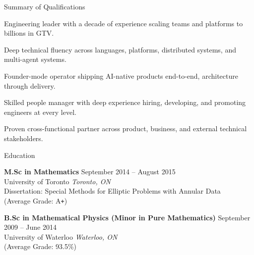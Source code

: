 \documentclass{resume} %
\begin{document}

\begin{rSection}{Summary of Qualifications}

\begin{rSubsection}{}{}{}{}
\item Engineering leader with a decade of experience scaling teams and platforms to billions in GTV.
\item Deep technical fluency across languages, platforms, distributed systems, and multi-agent systems.
\item Founder-mode operator shipping AI-native products end-to-end, architecture through delivery.
\item Skilled people manager with deep experience hiring, developing, and promoting engineers at every level.
\item Proven cross-functional partner across product, business, and external technical stakeholders.
\end{rSubsection}

\end{rSection}


\begin{rSection}{Education}

\textbf{M.Sc in Mathematics} \hfill {September 2014 -- August 2015} \\ 
University of Toronto  \hfill {\textit{Toronto, ON}} \\
Dissertation: Special Methods for Elliptic Problems with Annular Data \\
(Average Grade: A\verb!+!)

\textbf{B.Sc in Mathematical Physics (Minor in Pure Mathematics)} \hfill {September 2009 -- June 2014} \\ 
University of Waterloo \hfill {\textit{Waterloo, ON}} \\
(Average Grade: 93.5\%)

\end{rSection}

\end{document}
